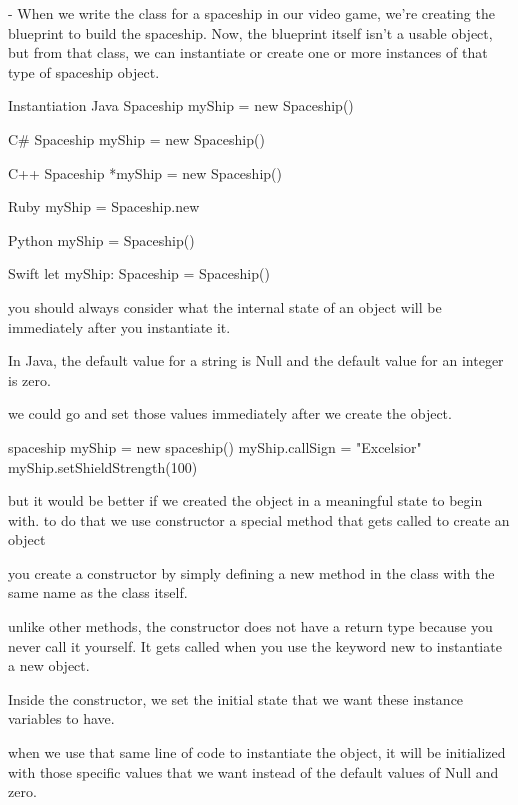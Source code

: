 - When we write the class for a spaceship in our video game, we're creating the blueprint to build the spaceship.
Now, the blueprint itself isn't a usable object, but from that class, we can instantiate or create one or more instances of that type of spaceship object.

Instantiation 
  Java  Spaceship myShip = new Spaceship()

  C#   Spaceship myShip = new Spaceship() 

  C++  Spaceship *myShip = new Spaceship()
  
  Ruby myShip = Spaceship.new

  Python myShip = Spaceship()

  Swift  let myShip: Spaceship = Spaceship()

  you should always consider what the internal state of an object will be immediately after you instantiate it.

  In Java, the default value for a string is Null and the default value for an integer is zero.

  we could go and set those values immediately after we create the object.

  
  spaceship myShip = new spaceship()
  myShip.callSign = "Excelsior"
  myShip.setShieldStrength(100)

  but it would be better if we created the object in a meaningful state to begin with. 
  to do that we use constructor 
    a special method that gets called to create an object 

    you create a constructor by simply defining a new method in the class with the same name as the class itself.

    unlike other methods, the constructor does not have a return type because you never call it yourself. It gets called when you use the keyword new to instantiate a new object. 

    Inside the constructor, we set the initial state that we want these instance variables to have. 

    when we use that same line of code to instantiate the object, it will be initialized with those specific values that we want instead of the default values of Null and zero.
